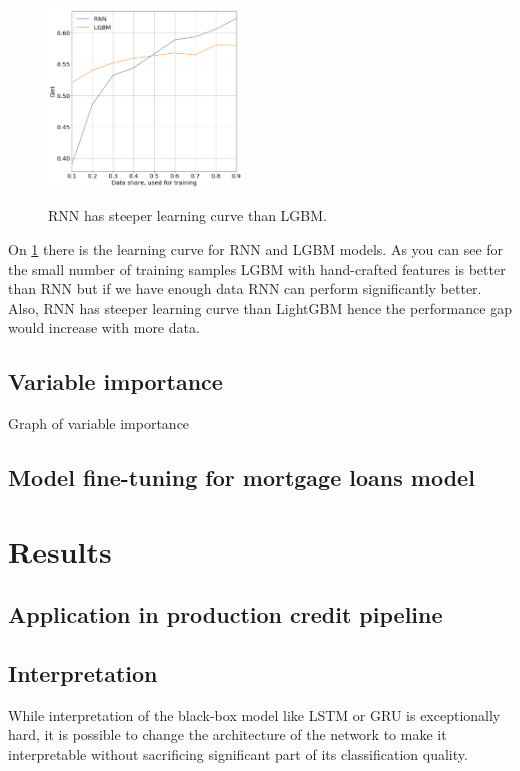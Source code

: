 \documentclass{sigkddExp}
\begin{document}
\begin{figure}
  \caption{RNN has steeper learning curve than LGBM.}
  \includegraphics[width=0.46\textwidth]{learning-curve.png}
  \label{fig1}
\end{figure}

On \ref{fig1} there is the learning curve for RNN and LGBM models. As you can see for the small number of training samples LGBM with hand-crafted features is better than RNN but if we have enough data RNN can perform significantly better. Also, RNN has steeper learning curve than LightGBM hence the performance gap would increase with more data.

\subsection{Variable importance}

Graph of variable importance

\subsection{Model fine-tuning for mortgage loans model}

\section{Results}

\subsection{Application in production credit pipeline}

\subsection{Interpretation}

While interpretation of the black-box model like LSTM or GRU is exceptionally hard, it is possible to change the architecture of the network to make it interpretable without sacrificing significant part of its classification quality.
\end{document}
